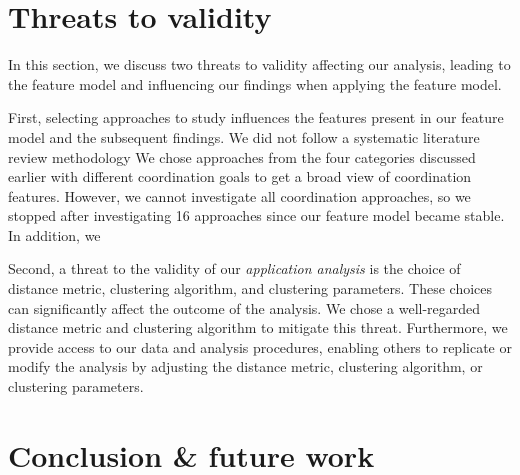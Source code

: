 \documentclass[runningheads]{llncs}
\begin{document}
\section{Threats to validity}
In this section, we discuss two threats to validity affecting our analysis, leading to the feature model and influencing our findings when applying the feature model.

First, selecting approaches to study influences the features present in our feature model and the subsequent findings.
We did not follow a systematic literature review methodology 
We chose approaches from the four categories discussed earlier with different coordination goals to get a broad view of coordination features.
However, we cannot investigate all coordination approaches, so we stopped after investigating 16 approaches since our feature model became stable.
In addition, we 

Second, a threat to the validity of our \textit{application analysis} is the choice of distance metric, clustering algorithm, and clustering parameters.
These choices can significantly affect the outcome of the analysis.
We chose a well-regarded distance metric and clustering algorithm to mitigate this threat.
Furthermore, we provide access to our data and analysis procedures, enabling others to replicate or modify the analysis by adjusting the distance metric, clustering algorithm, or clustering parameters.

\section{Conclusion \& future work} \label{sec: conclusion}



\end{document}
